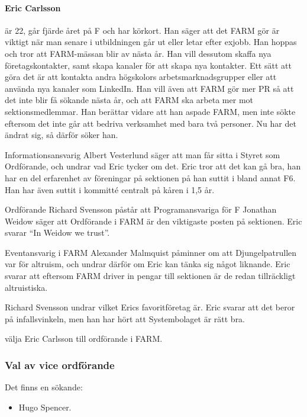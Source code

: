 \documentclass[hidelinks]{sektionsmote}
\begin{document}
\paragraph{Eric Carlsson} är 22, går fjärde året på F och har körkort.
Han säger att det FARM gör är viktigt när man senare i utbildningen går ut eller letar efter exjobb.
Han hoppas och tror att FARM-mässan blir av nästa år.
Han vill dessutom skaffa nya företagskontakter, samt skapa kanaler för att skapa nya kontakter.
Ett sätt att göra det är att kontakta andra högskolors arbetsmarknadsgrupper eller att använda nya kanaler som LinkedIn.
Han vill även att FARM gör mer PR så att det inte blir få sökande nästa år, och att FARM ska arbeta mer mot sektionsmedlemmar.
Han berättar vidare att han aspade FARM, men inte sökte eftersom det inte går att bedriva verksamhet med bara två personer.
Nu har det ändrat sig, så därför söker han.\par
Informationsansvarig Albert Vesterlund säger att man får sitta i Styret som Ordförande, och undrar vad Eric tycker om det.
Eric tror att det kan gå bra, han har en del erfarenhet av föreningar på sektionen på han suttit i bland annat F6.
Han har även suttit i kommitté centralt på kåren i 1,5 år.\par
Ordförande Richard Svensson påstår att Programansvariga för F Jonathan Weidow säger att Ordförande i FARM är den viktigaste posten på sektionen.
Eric svarar \enquote{In Weidow we trust}.\par
Eventansvarig i FARM Alexander Malmquist påminner om att Djungelpatrullen var för altruism, och undrar därför om Eric kan tänka sig något liknande.
Eric svarar att eftersom FARM driver in pengar till sektionen är de redan tillräckligt altruistiska.\par
Richard Svensson undrar vilket Erics favoritföretag är.
Eric svarar att det beror på infallsvinkeln, men han har hört att Systembolaget är rätt bra.

\begin{beslut}
  \item välja Eric Carlsson till ordförande i FARM.
\end{beslut}

\subsubsection{Val av vice ordförande}
Det finns en sökande:
\begin{itemize}
    \item Hugo Spencer.
\end{itemize}
\end{document}
